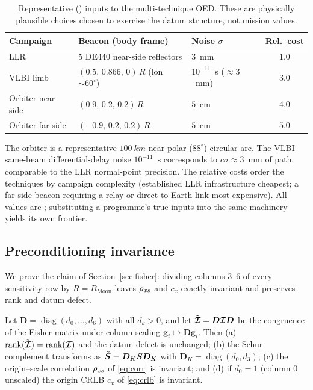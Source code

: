 \begin{table}[h]
\centering
\caption{Representative (\Modelled) inputs to the multi-technique OED. These are
physically plausible choices chosen to exercise the datum structure, not mission
values.}
\label{tab:oedinputs}
\small
\begin{tabular}{@{}lllc@{}}
\toprule
\textbf{Campaign} & \textbf{Beacon (body frame)} & \textbf{Noise $\sigma$} &
\textbf{Rel.\ cost} \\
\midrule
LLR              & 5 DE440 near-side reflectors        & $3$~mm            & $1.0$ \\
VLBI limb        & $(0.5,\,0.866,\,0)\,R$ (lon $\sim60^\circ$) & $10^{-11}$~s ($\approx3$~mm) & $3.0$ \\
Orbiter near-side& $(0.9,\,0.2,\,0.2)\,R$              & $5$~cm            & $4.0$ \\
Orbiter far-side & $(-0.9,\,0.2,\,0.2)\,R$             & $5$~cm            & $5.0$ \\
\bottomrule
\end{tabular}
\end{table}

\noindent The orbiter is a representative $\SI{100}{km}$ near-polar ($88^\circ$)
circular arc. The VLBI same-beam differential-delay noise $10^{-11}$~s corresponds
to $c\sigma\approx3$~mm of path, comparable to the LLR normal-point precision. The
relative costs order the techniques by campaign complexity (established LLR
infrastructure cheapest; a far-side beacon requiring a relay or direct-to-Earth
link most expensive). All values are \Modelled{}; substituting a programme's true
inputs into the same machinery yields its own frontier.

\subsection{Preconditioning invariance}
\label{app:precond}

We prove the claim of Section~\ref{sec:fisher}: dividing columns $3$--$6$ of every
sensitivity row by $R=R_{\mathrm{Moon}}$ leaves $\rho_{x s}$ and $c_x$ exactly invariant
and preserves rank and datum defect.

\begin{proposition}
\label{prop:precond}
Let $\bm{D}=\operatorname{diag}(d_0,\dots,d_6)$ with all $d_k>0$, and let
$\tilde{\bm{\mathcal{I}}}=\bm{D}\bm{\mathcal{I}}\bm{D}$ be the congruence of the Fisher matrix under
column scaling $\bm{g}_i\mapsto\bm{D}\bm{g}_i$. Then \textnormal{(a)}
$\operatorname{rank}(\tilde{\bm{\mathcal{I}}})=\operatorname{rank}(\bm{\mathcal{I}})$ and the datum
defect is unchanged; \textnormal{(b)} the Schur complement transforms as
$\tilde{\bm{S}}=\bm{D}_K\bm{S}\bm{D}_K$ with $\bm{D}_K=\operatorname{diag}(d_0,d_3)$;
\textnormal{(c)} the origin--scale correlation $\rho_{x s}$ of \eqref{eq:corr} is
invariant; and \textnormal{(d)} if $d_0=1$ (column $0$ unscaled) the origin CRLB
$c_x$ of \eqref{eq:crlb} is invariant.
\end{proposition}

